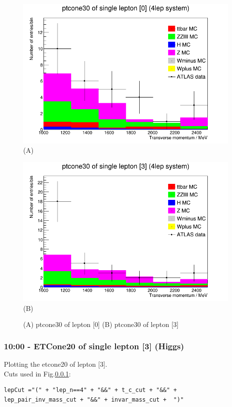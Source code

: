 \begin{figure}[h!]
    \centering
    \begin{minipage}{0.5\textwidth}
        \centering
        \includegraphics[width=\linewidth]{plots/06-03-2021/07-34_06-03-21.png}
        (A)
    \end{minipage}\hfill
    \begin{minipage}{0.5\textwidth}
        \centering
        \includegraphics[width=\linewidth]{plots/06-03-2021/08-33_06-03-21.png}
        (B)
    \end{minipage}
    \caption{(A) ptcone30 of lepton [0] (B) ptcone30 of lepton [3]}
    \label{fig:07-33_06-03-21}
\end{figure}

\subsubsection{10:00 - ETCone20 of single lepton [3] (Higgs)}
Plotting the etcone20 of lepton [3].
\\
Cuts used in Fig.\ref{}:
\begin{lstlisting}
lepCut ="(" + "lep_n==4" + "&&" + t_c_cut + "&&" + lep_pair_inv_mass_cut + "&&" + invar_mass_cut +  ")"
\end{lstlisting}

